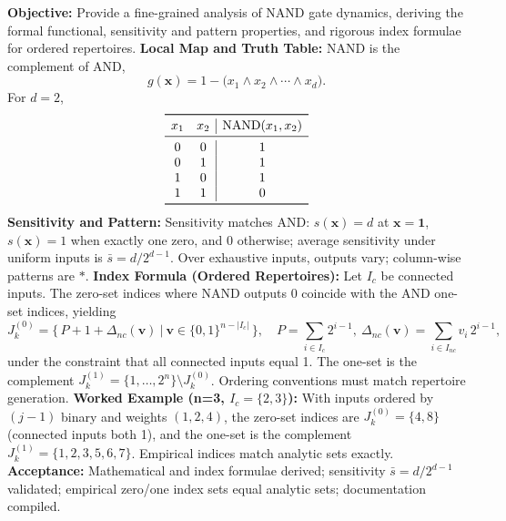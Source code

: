 \textbf{Objective:} Provide a fine-grained analysis of NAND gate dynamics, deriving the formal functional, sensitivity and pattern properties, and rigorous index formulae for ordered repertoires.
\textbf{Local Map and Truth Table:} NAND is the complement of AND,
\[
g(\mathbf{x}) = 1 - \big( x_1 \land x_2 \land \cdots \land x_d \big).
\]
For \(d=2\),
\[
\begin{array}{cc|c}
\toprule
 x_1 & x_2 & \mathrm{NAND}(x_1,x_2) \\
\midrule
 0 & 0 & 1 \\
 0 & 1 & 1 \\
 1 & 0 & 1 \\
 1 & 1 & 0 \\
\bottomrule
\end{array}
\]
\textbf{Sensitivity and Pattern:} Sensitivity matches AND: \(s(\mathbf{x})=d\) at \(\mathbf{x}=\mathbf{1}\), \(s(\mathbf{x})=1\) when exactly one zero, and 0 otherwise; average sensitivity under uniform inputs is \(\bar{s}=d/2^{d-1}\). Over exhaustive inputs, outputs vary; column-wise patterns are \(*\).
\textbf{Index Formula (Ordered Repertoires):} Let \(I_c\) be connected inputs. The zero-set indices where NAND outputs 0 coincide with the AND one-set indices, yielding
\[
J_k^{(0)}=\big\{\,P+1+\Delta_{nc}(\mathbf{v})\ \big|\ \mathbf{v}\in\{0,1\}^{n-\lvert I_c\rvert}\,\big\},\quad P=\sum_{i\in I_c}2^{i-1},\ \Delta_{nc}(\mathbf{v})=\sum_{i\in I_{nc}} v_i\,2^{i-1},
\]
under the constraint that all connected inputs equal 1. The one-set is the complement \(J_k^{(1)}=\{1,\dots,2^n\}\setminus J_k^{(0)}\). Ordering conventions must match repertoire generation.
\textbf{Worked Example (n=3, \(I_c=\{2,3\}\)):} With inputs ordered by \((j-1)\) binary and weights \((1,2,4)\), the zero-set indices are \(J_k^{(0)}=\{4,8\}\) (connected inputs both 1), and the one-set is the complement \(J_k^{(1)}=\{1,2,3,5,6,7\}\). Empirical indices match analytic sets exactly.
\textbf{Acceptance:} Mathematical and index formulae derived; sensitivity \(\bar{s}=d/2^{d-1}\) validated; empirical zero/one index sets equal analytic sets; documentation compiled.


